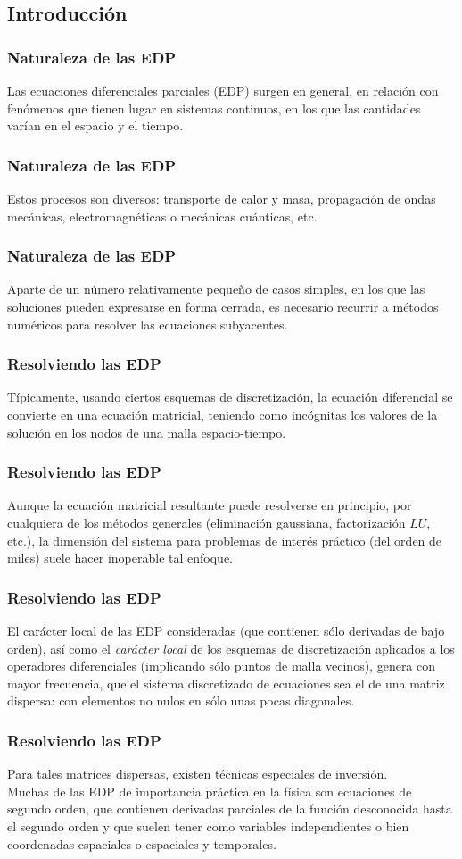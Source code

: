 \subsection{Introducción}
\begin{frame}
\frametitle{Naturaleza de las EDP}
Las ecuaciones diferenciales parciales (EDP) surgen en general, en relación con fenómenos que tienen lugar en sistemas continuos, en los que las cantidades varían en el espacio y el tiempo.
\end{frame}
\begin{frame}
\frametitle{Naturaleza de las EDP}
Estos procesos son diversos: transporte de calor y masa, propagación de ondas mecánicas, electromagnéticas o mecánicas cuánticas, etc.
\end{frame}
\begin{frame}
\frametitle{Naturaleza de las EDP}
Aparte de un número relativamente pequeño de casos simples, en los que las soluciones pueden expresarse en forma cerrada, es necesario recurrir a métodos numéricos para resolver las ecuaciones subyacentes.
\end{frame}
\begin{frame}
\frametitle{Resolviendo las EDP}
Típicamente, usando ciertos esquemas de discretización, la ecuación diferencial se convierte en una ecuación matricial, teniendo como incógnitas los valores de la solución en los nodos de una malla espacio-tiempo.
\end{frame}
\begin{frame}
\frametitle{Resolviendo las EDP}
Aunque la ecuación matricial resultante puede resolverse en principio, por cualquiera de los métodos generales (eliminación gaussiana, factorización $LU$, etc.), la dimensión del sistema para problemas de interés práctico (del orden de miles) suele hacer inoperable tal enfoque.
\end{frame}
\begin{frame}
\frametitle{Resolviendo las EDP}
El carácter local de las EDP consideradas (que contienen sólo derivadas de bajo orden), así como el \emph{carácter local} de los esquemas de discretización aplicados a los operadores diferenciales (implicando sólo puntos de malla vecinos), genera con mayor frecuencia, que el sistema discretizado de ecuaciones sea el de una matriz dispersa: con elementos no nulos en sólo unas pocas diagonales.
\end{frame}
\begin{frame}
\frametitle{Resolviendo las EDP}
Para tales matrices dispersas, existen técnicas especiales de inversión.
\\
\bigskip
Muchas de las EDP de importancia práctica en la física son ecuaciones de segundo orden, que contienen derivadas parciales de la función desconocida hasta el segundo orden y que suelen tener como variables independientes o bien coordenadas espaciales o espaciales y temporales.
\end{frame}
